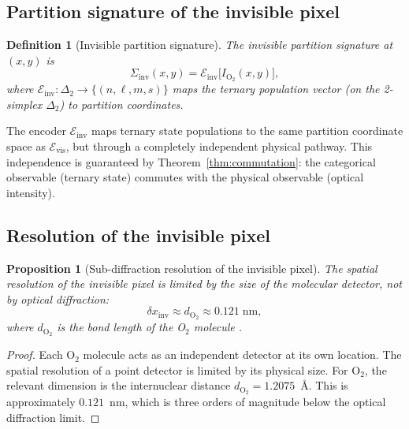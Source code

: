 \documentclass[11pt,twocolumn,a4paper]{article}
\newtheorem{proposition}[theorem]{Proposition}
\newtheorem{definition}{Definition}
\newcommand{\Siginv}{\Sigma_{\mathrm{inv}}}
\begin{document}
\subsection{Partition signature of the invisible pixel}

\begin{definition}[Invisible partition signature]\label{def:invsig}
The invisible partition signature at $(x,y)$ is
\begin{equation}\label{eq:invsig}
\Siginv(x,y) = \mathcal{E}_{\mathrm{inv}}\bigl[I_{\mathrm{O}_2}(x,y)\bigr],
\end{equation}
where $\mathcal{E}_{\mathrm{inv}}: \Delta_2 \to \{(n,\ell,m,s)\}$ maps the ternary population vector (on the 2-simplex $\Delta_2$) to partition coordinates.
\end{definition}

The encoder $\mathcal{E}_{\mathrm{inv}}$ maps ternary state populations to the same partition coordinate space as $\mathcal{E}_{\mathrm{vis}}$, but through a completely independent physical pathway.
This independence is guaranteed by Theorem~\ref{thm:commutation}: the categorical observable (ternary state) commutes with the physical observable (optical intensity).

\subsection{Resolution of the invisible pixel}

\begin{proposition}[Sub-diffraction resolution of the invisible pixel]\label{prop:inv_resolution}
The spatial resolution of the invisible pixel is limited by the size of the molecular detector, not by optical diffraction:
\begin{equation}\label{eq:inv_resolution}
\delta x_{\mathrm{inv}} \approx d_{\mathrm{O}_2} \approx 0.121\;\text{nm},
\end{equation}
where $d_{\mathrm{O}_2}$ is the bond length of the O$_2$ molecule \citep{Huber1979}.
\end{proposition}
\begin{proof}
Each O$_2$ molecule acts as an independent detector at its own location.
The spatial resolution of a point detector is limited by its physical size.
For O$_2$, the relevant dimension is the internuclear distance $d_{\mathrm{O}_2} = 1.2075$~\AA.
This is approximately $0.121$~nm, which is three orders of magnitude below the optical diffraction limit.
\end{proof}
\end{document}
